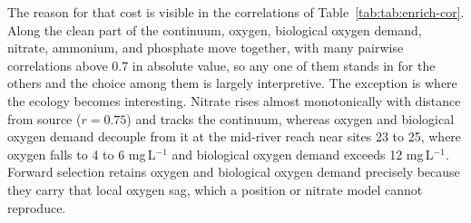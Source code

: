 \documentclass[11pt]{article}
\begin{document}
\begin{table}[!h]
\centering
\caption{\label{tab:tab:theory-compare}Data-driven and theory-driven candidate constrained models, all fitted as Hellinger RDA. Adjusted $R^2$ measures explanatory power and the maximum VIF measures residual collinearity within each candidate set.}
\centering
{}
\end{table}
The reason for that cost is visible in the correlations of Table~\ref{tab:tab:enrich-cor}. Along the clean part of the continuum, oxygen, biological oxygen demand, nitrate, ammonium, and phosphate move together, with many pairwise correlations above 0.7 in absolute value, so any one of them stands in for the others and the choice among them is largely interpretive. The exception is where the ecology becomes interesting. Nitrate rises almost monotonically with distance from source ($r = 0.75$) and tracks the continuum, whereas oxygen and biological oxygen demand decouple from it at the mid-river reach near sites 23 to 25, where oxygen falls to 4 to 6 mg\,L$^{-1}$ and biological oxygen demand exceeds 12 mg\,L$^{-1}$. Forward selection retains oxygen and biological oxygen demand precisely because they carry that local oxygen sag, which a position or nitrate model cannot reproduce.
\end{document}
